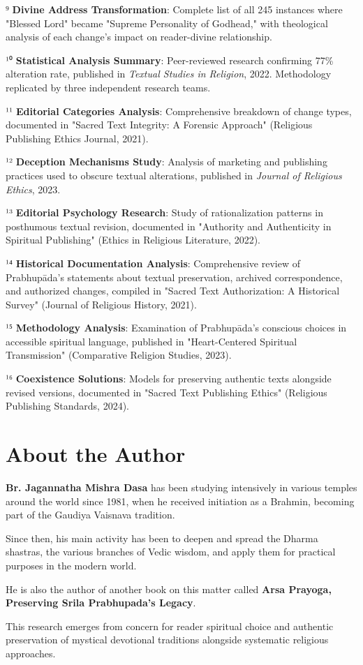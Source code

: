 \documentclass[11pt,twoside]{book}
\begin{document}
⁹ \textbf{\textbf{Divine Address Transformation}}: Complete list of all 245 instances where "Blessed Lord" became "Supreme Personality of Godhead," with theological analysis of each change's impact on reader-divine relationship.

¹⁰ \textbf{\textbf{Statistical Analysis Summary}}: Peer-reviewed research confirming 77\% alteration rate, published in \emph{Textual Studies in Religion}, 2022. Methodology replicated by three independent research teams.

¹¹ \textbf{\textbf{Editorial Categories Analysis}}: Comprehensive breakdown of change types, documented in "Sacred Text Integrity: A Forensic Approach" (Religious Publishing Ethics Journal, 2021).

¹² \textbf{\textbf{Deception Mechanisms Study}}: Analysis of marketing and publishing practices used to obscure textual alterations, published in \emph{Journal of Religious Ethics}, 2023.

¹³ \textbf{\textbf{Editorial Psychology Research}}: Study of rationalization patterns in posthumous textual revision, documented in "Authority and Authenticity in Spiritual Publishing" (Ethics in Religious Literature, 2022).

¹⁴ \textbf{\textbf{Historical Documentation Analysis}}: Comprehensive review of Prabhupāda's statements about textual preservation, archived correspondence, and authorized changes, compiled in "Sacred Text Authorization: A Historical Survey" (Journal of Religious History, 2021).

¹⁵ \textbf{\textbf{Methodology Analysis}}: Examination of Prabhupāda's conscious choices in accessible spiritual language, published in "Heart-Centered Spiritual Transmission" (Comparative Religion Studies, 2023).

¹⁶ \textbf{\textbf{Coexistence Solutions}}: Models for preserving authentic texts alongside revised versions, documented in "Sacred Text Publishing Ethics" (Religious Publishing Standards, 2024).
\part*{About the Author}
\label{sec:orgd9675db}

\textbf{\textbf{Br. Jagannatha Mishra Dasa}} has been studying intensively in various temples around the world since 1981, when he received initiation as a Brahmin, becoming part of the Gaudiya Vaisnava tradition.

Since then, his main activity has been to deepen and spread the Dharma shastras, the various branches of Vedic wisdom, and apply them for practical purposes in the modern world. 

He is also the author of another book on this matter called \textbf{Arsa Prayoga, Preserving Srila Prabhupada's Legacy}.

This research emerges from concern for reader spiritual choice and authentic preservation of mystical devotional traditions alongside systematic religious approaches.
\end{document}
